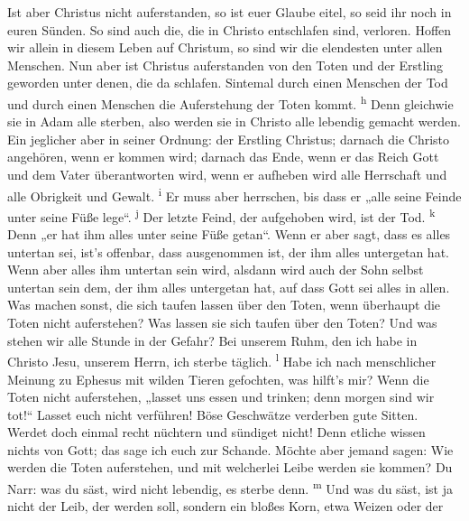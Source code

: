  Ist aber Christus nicht auferstanden, so ist euer Glaube
eitel, so seid ihr noch in euren Sünden.  So sind auch
die, die in Christo entschlafen sind, verloren.  Hoffen
wir allein in diesem Leben auf Christum, so sind wir die elendesten
unter allen Menschen.  Nun aber ist Christus auferstanden
von den Toten und der Erstling geworden unter denen, die da schlafen.
 Sintemal durch einen Menschen der Tod und durch einen
Menschen die Auferstehung der Toten kommt. \textsuperscript{h}
 Denn gleichwie sie in Adam alle sterben, also werden sie
in Christo alle lebendig gemacht werden.  Ein jeglicher
aber in seiner Ordnung: der Erstling Christus; darnach die Christo
angehören, wenn er kommen wird;  darnach das Ende, wenn
er das Reich Gott und dem Vater überantworten wird, wenn er aufheben
wird alle Herrschaft und alle Obrigkeit und Gewalt. \textsuperscript{i}
 Er muss aber herrschen, bis dass er „alle seine Feinde
unter seine Füße lege``. \textsuperscript{j}  Der letzte
Feind, der aufgehoben wird, ist der Tod. \textsuperscript{k}
 Denn „er hat ihm alles unter seine Füße getan``. Wenn er
aber sagt, dass es alles untertan sei, ist's offenbar, dass ausgenommen
ist, der ihm alles untergetan hat.  Wenn aber alles ihm
untertan sein wird, alsdann wird auch der Sohn selbst untertan sein dem,
der ihm alles untergetan hat, auf dass Gott sei alles in allen.
 Was machen sonst, die sich taufen lassen über den Toten,
wenn überhaupt die Toten nicht auferstehen? Was lassen sie sich taufen
über den Toten?  Und was stehen wir alle Stunde in der
Gefahr?  Bei unserem Ruhm, den ich habe in Christo Jesu,
unserem Herrn, ich sterbe täglich. \textsuperscript{l} 
Habe ich nach menschlicher Meinung zu Ephesus mit wilden Tieren
gefochten, was hilft's mir? Wenn die Toten nicht auferstehen, „lasset
uns essen und trinken; denn morgen sind wir tot!{}`` 
Lasset euch nicht verführen! Böse Geschwätze verderben gute Sitten.
 Werdet doch einmal recht nüchtern und sündiget nicht!
Denn etliche wissen nichts von Gott; das sage ich euch zur Schande.
 Möchte aber jemand sagen: Wie werden die Toten
auferstehen, und mit welcherlei Leibe werden sie kommen? 
Du Narr: was du säst, wird nicht lebendig, es sterbe denn.
\textsuperscript{m}  Und was du säst, ist ja nicht der
Leib, der werden soll, sondern ein bloßes Korn, etwa Weizen oder der
